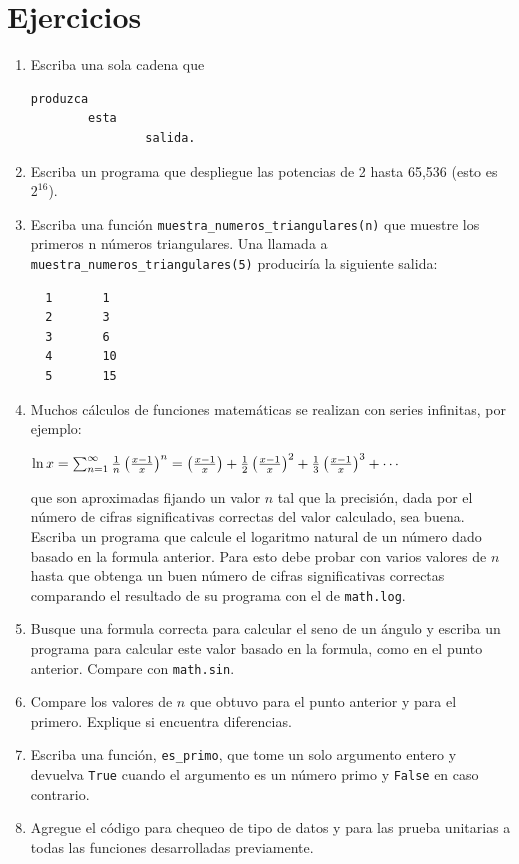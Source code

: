 \section{Ejercicios}


\begin{enumerate}

\item Escriba una sola cadena que

\beforeverb
\begin{verbatim}
produzca
        esta
                salida.
\end{verbatim}
\afterverb


 \item Escriba un programa que despliegue las
potencias de 2 hasta 65,536 (esto es $2^{16}$).  

 \item Escriba una función \verb+muestra_numeros_triangulares(n)+ que 
 muestre los primeros n números triangulares. Una llamada a \verb+muestra_numeros_triangulares(5)+ 
 produciría la siguiente salida:
 \beforeverb
  \begin{verbatim}
  1       1
  2       3
  3       6
  4       10
  5       15
  \end{verbatim}
\afterverb


 \item Muchos cálculos de funciones matemáticas se realizan con series infinitas, por ejemplo:

$\ln{x} = \sum_{n=1}^\infty {1 \over {n}} \left( {x - 1 \over x} \right)^n = \left( {x - 1 \over x} \right) + {1 \over 2} \left( {x - 1 \over x} \right)^2 + {1 \over 3} \left( {x - 1 \over x} \right)^3 + \cdots $

que son aproximadas fijando un valor $n$ tal que la precisión, dada por el número de cifras significativas
correctas del valor calculado, sea buena.
 Escriba un programa que calcule el logaritmo natural de un número dado basado en la formula anterior.
 Para esto debe probar con varios valores de $n$ hasta que obtenga un buen número de cifras significativas correctas
 comparando el resultado de su programa con el de \verb+math.log+.
 
 \item Busque una formula correcta para calcular el seno de un ángulo y escriba un programa para calcular
 este valor basado en la formula, como en el punto anterior. Compare con \verb+math.sin+. 
 
 \item Compare los valores de $n$  que obtuvo para el punto anterior y para el primero. Explique si encuentra
 diferencias.
 
 \item Escriba una función, \verb+es_primo+, que tome un solo argumento entero y devuelva \verb+True+ cuando el argumento 
 es un número primo y \verb+False+ en caso contrario. 
 
 
 \item Agregue el código para chequeo de tipo de datos y para las prueba unitarias a todas las funciones desarrolladas previamente.
 
\end{enumerate}